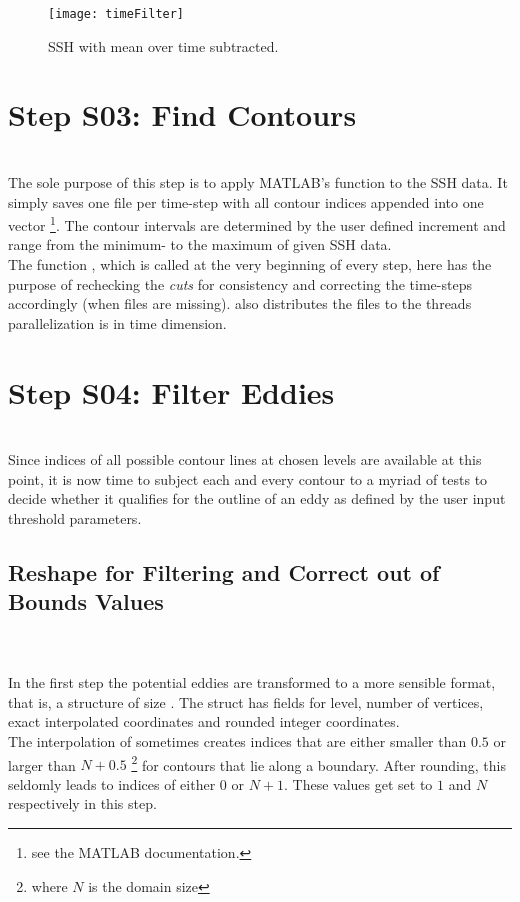 \begin{figure*}
	\texttt{[image: timeFilter]}
	\caption{SSH with mean over time subtracted.}
	\label{fig:timeFilter}
\end{figure*}
 \section{Step S03: Find Contours} \label{S:03}
\\
The sole purpose of this step is to apply MATLAB's  function
to the SSH data. It simply saves one file per time-step with all contour indices
appended into one vector \footnote{see the MATLAB documentation.}. The contour
intervals are determined by the user defined increment and range from the
minimum- to the maximum of given SSH data. \\
The function , which is called at the very beginning of
every step, here has the purpose of rechecking the \textit{cuts} for
consistency and correcting the time-steps accordingly (\ie when files are
missing).  also distributes the files to the threads \ie
parallelization is in time dimension.
\section{Step S04: Filter Eddies} \label{S:04}
\\
Since indices of all possible contour lines at chosen levels are available at
this point, it is now time to subject each and every contour to a
myriad of tests to decide whether it qualifies for the outline of an eddy as
defined by the user input threshold parameters.
\subsection{Reshape for Filtering and Correct out of Bounds Values}
\\
\noindent{}\\
In the first step the potential eddies are transformed to a more sensible
format, that is, a structure  of size . The struct has fields for level, number of
vertices, exact \ie interpolated coordinates and rounded integer coordinates.\\
The interpolation of  sometimes creates indices that are
either smaller than $0.5$ or larger than $N+0.5$ \footnote{where $N$ is the
domain size} for contours that lie along a boundary. After rounding, this
seldomly leads to indices of either $0$ or $N+1$. These values get set to $1$
and $N$ respectively in this step.
